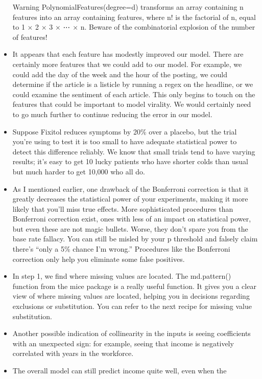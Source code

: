 \documentclass[]{book}
\begin{document}
\begin{itemize}
  Warning PolynomialFeatures(degree=d) transforms an array containing n
  features into an array containing features, where n! is the factorial
  of n, equal to 1 × 2 × 3 × ⋯ × n. Beware of the combinatorial
  explosion of the number of features!
\item
  It appears that each feature has modestly improved our model. There
  are certainly more features that we could add to our model. For
  example, we could add the day of the week and the hour of the posting,
  we could determine if the article is a listicle by running a regex on
  the headline, or we could examine the sentiment of each article. This
  only begins to touch on the features that could be important to model
  virality. We would certainly need to go much further to continue
  reducing the error in our model.
\item
  Suppose Fixitol reduces symptoms by 20\% over a placebo, but the trial
  you're using to test it is too small to have adequate statistical
  power to detect this difference reliably. We know that small trials
  tend to have varying results; it's easy to get 10 lucky patients who
  have shorter colds than usual but much harder to get 10,000 who all
  do.
\item
  As I mentioned earlier, one drawback of the Bonferroni correction is
  that it greatly decreases the statistical power of your experiments,
  making it more likely that you'll miss true effects. More
  sophisticated procedures than Bonferroni correction exist, ones with
  less of an impact on statistical power, but even these are not magic
  bullets. Worse, they don't spare you from the base rate fallacy. You
  can still be misled by your p threshold and falsely claim there's
  ``only a 5\% chance I'm wrong.'' Procedures like the Bonferroni
  correction only help you eliminate some false positives.
\item
  In step 1, we find where missing values are located. The md.pattern()
  function from the mice package is a really useful function. It gives
  you a clear view of where missing values are located, helping you in
  decisions regarding exclusions or substitution. You can refer to the
  next recipe for missing value substitution.
\item
  Another possible indication of collinearity in the inputs is seeing
  coefficients with an unexpected sign: for example, seeing that income
  is negatively correlated with years in the workforce.
\item
  The overall model can still predict income quite well, even when the

\end{itemize}
\end{document}
